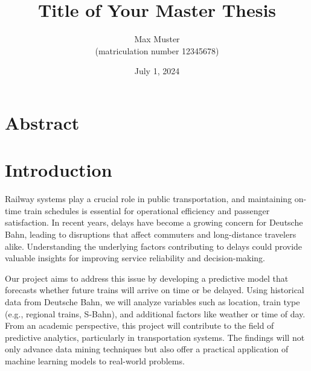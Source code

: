\documentclass[a4paper,oneside,bibliography=totoc]{scrbook}
\begin{document}
    \frontmatter \subject{Master Thesis} %
    \title{Title of Your Master Thesis}
    \author{Max Muster\\
    (matriculation number 12345678)} \date{July 1, 2024}
    \publishers{{\small Submitted to}\\
    Data and Web Science Group\\
    Prof.\ Dr.\ Right-Name-Here\\
    University of Mannheim\\}
    \maketitle


    \chapter{Abstract}

    \begingroup%
    \hypersetup{hidelinks}%
    \tableofcontents%
    \endgroup



    \mainmatter


    \chapter{Introduction}
    \label{ch:intro}

    Railway systems play a crucial role in public transportation, and maintaining on-time train schedules is essential for operational efficiency and passenger satisfaction. In recent years, delays have become a growing concern for Deutsche Bahn, leading to disruptions that affect commuters and long-distance travelers alike. Understanding the underlying factors contributing to delays could provide valuable insights for improving service reliability and decision-making.

    Our project aims to address this issue by developing a predictive model that forecasts whether future trains will arrive on time or be delayed. Using historical data from Deutsche Bahn, we will analyze variables such as location, train type (e.g., regional trains, S-Bahn), and additional factors like weather or time of day. From an academic perspective, this project will contribute to the field of predictive analytics, particularly in transportation systems. The findings will not only advance data mining techniques but also offer a practical application of machine learning models to real-world problems.
\end{document}
